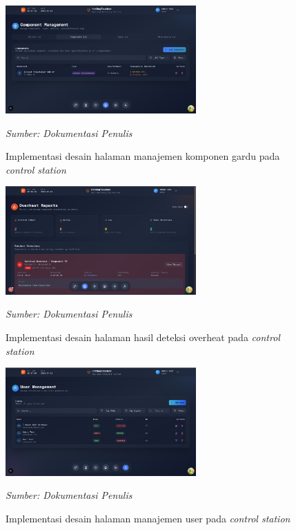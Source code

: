 \begin{figure}[H]
  \centering
  \includegraphics[width=0.65\textwidth]{gambar/bab3/fe/component.png}
  \caption{Implementasi desain halaman manajemen komponen gardu pada \emph{control station}}
  \label{fig:component-management}
  \footnotesize\emph{Sumber: Dokumentasi Penulis}
\end{figure}

\begin{figure}[H]
  \centering
  \includegraphics[width=0.65\textwidth]{gambar/bab3/fe/overheat.png}
  \caption{Implementasi desain halaman hasil deteksi overheat pada \emph{control station}}
  \label{fig:overheat-detection}
  \footnotesize\emph{Sumber: Dokumentasi Penulis}
\end{figure}

\begin{figure}[H]
  \centering
  \includegraphics[width=0.65\textwidth]{gambar/bab3/fe/user.png}
  \caption{Implementasi desain halaman manajemen user pada \emph{control station}}
  \label{fig:user-management}
  \footnotesize\emph{Sumber: Dokumentasi Penulis}
\end{figure}


